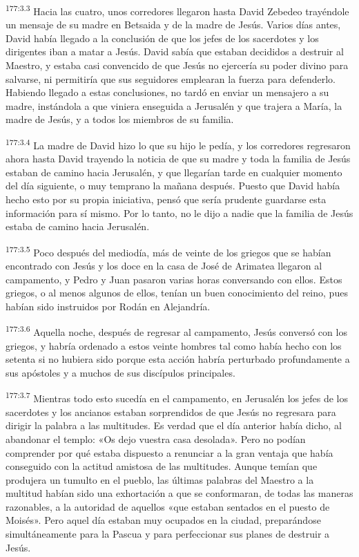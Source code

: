 \par 
\textsuperscript{177:3.3} Hacia las cuatro, unos corredores llegaron hasta David Zebedeo trayéndole un mensaje de su madre en Betsaida y de la madre de Jesús. Varios días antes, David había llegado a la conclusión de que los jefes de los sacerdotes y los dirigentes iban a matar a Jesús. David sabía que estaban decididos a destruir al Maestro, y estaba casi convencido de que Jesús no ejercería su poder divino para salvarse, ni permitiría que sus seguidores emplearan la fuerza para defenderlo. Habiendo llegado a estas conclusiones, no tardó en enviar un mensajero a su madre, instándola a que viniera enseguida a Jerusalén y que trajera a María, la madre de Jesús, y a todos los miembros de su familia.

\par 
\textsuperscript{177:3.4} La madre de David hizo lo que su hijo le pedía, y los corredores regresaron ahora hasta David trayendo la noticia de que su madre y toda la familia de Jesús estaban de camino hacia Jerusalén, y que llegarían tarde en cualquier momento del día siguiente, o muy temprano la mañana después. Puesto que David había hecho esto por su propia iniciativa, pensó que sería prudente guardarse esta información para sí mismo. Por lo tanto, no le dijo a nadie que la familia de Jesús estaba de camino hacia Jerusalén.

\par 
\textsuperscript{177:3.5} Poco después del mediodía, más de veinte de los griegos que se habían encontrado con Jesús y los doce en la casa de José de Arimatea llegaron al campamento, y Pedro y Juan pasaron varias horas conversando con ellos. Estos griegos, o al menos algunos de ellos, tenían un buen conocimiento del reino, pues habían sido instruidos por Rodán en Alejandría.

\par 
\textsuperscript{177:3.6} Aquella noche, después de regresar al campamento, Jesús conversó con los griegos, y habría ordenado a estos veinte hombres tal como había hecho con los setenta si no hubiera sido porque esta acción habría perturbado profundamente a sus apóstoles y a muchos de sus discípulos principales.

\par 
\textsuperscript{177:3.7} Mientras todo esto sucedía en el campamento, en Jerusalén los jefes de los sacerdotes y los ancianos estaban sorprendidos de que Jesús no regresara para dirigir la palabra a las multitudes. Es verdad que el día anterior había dicho, al abandonar el templo: «Os dejo vuestra casa desolada». Pero no podían comprender por qué estaba dispuesto a renunciar a la gran ventaja que había conseguido con la actitud amistosa de las multitudes. Aunque temían que produjera un tumulto en el pueblo, las últimas palabras del Maestro a la multitud habían sido una exhortación a que se conformaran, de todas las maneras razonables, a la autoridad de aquellos «que estaban sentados en el puesto de Moisés». Pero aquel día estaban muy ocupados en la ciudad, preparándose simultáneamente para la Pascua y para perfeccionar sus planes de destruir a Jesús.

